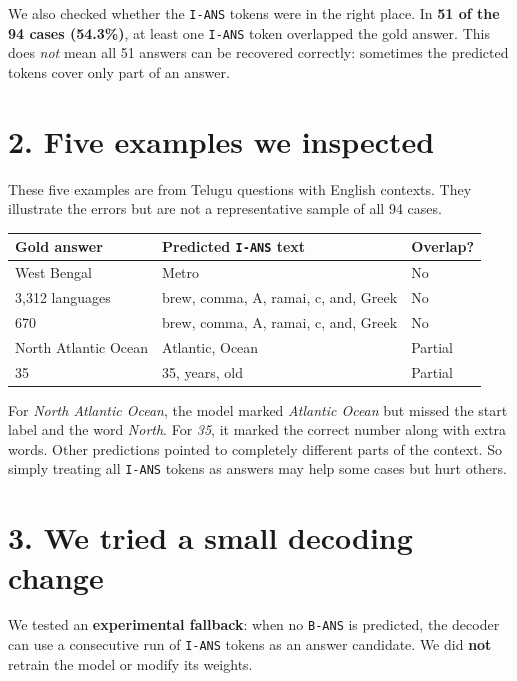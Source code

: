 \documentclass[11pt,a4paper]{article}
\begin{document}
We also checked whether the \texttt{I-ANS} tokens were in the right place. In \textbf{51 of the 94 cases (54.3\%)}, at least one \texttt{I-ANS} token overlapped the gold answer. This does \emph{not} mean all 51 answers can be recovered correctly: sometimes the predicted tokens cover only part of an answer.

\section*{2. Five examples we inspected}

These five examples are from Telugu questions with English contexts. They illustrate the errors but are not a representative sample of all 94 cases.

\begin{center}
\small
\begin{tabular}{p{3.8cm}p{7.2cm}p{1.8cm}}
\hline
\textbf{Gold answer} & \textbf{Predicted \texttt{I-ANS} text} & \textbf{Overlap?} \\
\hline
West Bengal & Metro & No \\
3,312 languages & brew, comma, A, ramai, c, and, Greek & No \\
670 & brew, comma, A, ramai, c, and, Greek & No \\
North Atlantic Ocean & Atlantic, Ocean & Partial \\
35 & 35, years, old & Partial \\
\hline
\end{tabular}
\end{center}
\normalsize

For \emph{North Atlantic Ocean}, the model marked \emph{Atlantic Ocean} but missed the start label and the word \emph{North}. For \emph{35}, it marked the correct number along with extra words. Other predictions pointed to completely different parts of the context. So simply treating all \texttt{I-ANS} tokens as answers may help some cases but hurt others.

\section*{3. We tried a small decoding change}

We tested an \textbf{experimental fallback}: when no \texttt{B-ANS} is predicted, the decoder can use a consecutive run of \texttt{I-ANS} tokens as an answer candidate. We did \textbf{not} retrain the model or modify its weights.
\end{document}
